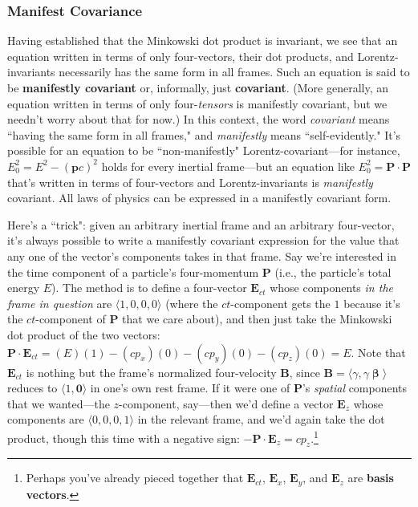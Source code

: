 \documentclass[12pt]{article}
\renewcommand{\vv}[1]{\mathbf{#1}}
\newcommand{\vvbeta}{\bm{\upbeta}}
\begin{document}
\subsubsection{Manifest Covariance}\label{sssec:mc}

Having established that the Minkowski dot product is invariant, we see that an equation written in terms of only four-vectors, their dot products, and Lorentz-invariants necessarily has the same form in all frames. Such an equation is said to be \textbf{manifestly covariant} or, informally, just \textbf{covariant}. (More generally, an equation written in terms of only four-\emph{tensors} is manifestly covariant, but we needn't worry about that for now.) In this context, the word \emph{covariant} means ``having the same form in all frames," and \emph{manifestly} means ``self-evidently." It's possible for an equation to be ``non-manifestly" Lorentz-covariant---for instance, $E_0^2 = E^2 - (\vv p c)^2$ holds for every inertial frame---but an equation like ${E_0^2 = \vv P \cdot \vv P}$ that's written in terms of four-vectors and Lorentz-invariants is \emph{manifestly} covariant. All laws of physics can be expressed in a manifestly covariant form.

Here's a ``trick": given an arbitrary inertial frame and an arbitrary four-vector, it's always possible to write a manifestly covariant expression for the value that any one of the vector's components takes in that frame. Say we're interested in the time component of a particle's four-momentum $\vv P$ (i.e., the particle's total energy $E$). The method is to define a four-vector $\vv E _{ct}$ whose components \emph{in the frame in question} are $\langle 1, 0, 0, 0 \rangle$ (where the $ct$-component gets the $1$ because it's the $ct$-component of $\vv P$ that we care about), and then just take the Minkowski dot product of the two vectors: ${\vv P \cdot \vv E_{ct} = (E)(1) - (cp_x)(0) - (cp_y)(0) - (cp_z)(0) = E}$. Note that $\vv E_{ct}$ is nothing but the frame's normalized four-velocity $\vv B$, since $\vv B = \langle \gamma, \gamma \vvbeta \rangle$ reduces to $\langle 1, \vv 0 \rangle$ in one's own rest frame. If it were one of $\vv P$'s \emph{spatial} components that we wanted---the $z$-component, say---then we'd define a vector $\vv E_z$ whose components are $\langle 0, 0, 0, 1 \rangle$ in the relevant frame, and we'd again take the dot product, though this time with a negative sign: $- \vv P \cdot \vv E_z = c p_z$.\footnote{Perhaps you've already pieced together that $\vv E_{ct}$, $\vv E_{x}$, $\vv E_{y}$, and $\vv E_z$ are \textbf{basis vectors}.}
\end{document}
